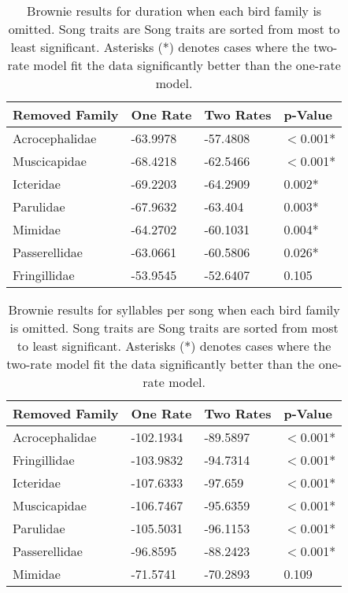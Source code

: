 \documentclass[a4paper,12pt]{article}
\begin{document}
\begin{table}[ht]
\caption{Brownie results for duration when each bird family is omitted. Song traits are Song traits are sorted from most to least significant. Asterisks (*) denotes cases where the two-rate model fit the data significantly better than the one-rate model.}
\centering
\begin{tabular}{llll}
  \hline
Removed Family & One Rate & Two Rates & p-Value \\ 
  \hline
Acrocephalidae & -63.9978 & -57.4808 & $<$0.001* \\ 
  Muscicapidae & -68.4218 & -62.5466 & $<$0.001* \\ 
  Icteridae & -69.2203 & -64.2909 & 0.002* \\ 
  Parulidae & -67.9632 & -63.404 & 0.003* \\ 
  Mimidae & -64.2702 & -60.1031 & 0.004* \\ 
  Passerellidae & -63.0661 & -60.5806 & 0.026* \\ 
  Fringillidae & -53.9545 & -52.6407 & 0.105 \\ 
   \hline
\end{tabular}
\end{table}
\begin{table}[ht]
\caption{Brownie results for syllables per song when each bird family is omitted. Song traits are Song traits are sorted from most to least significant. Asterisks (*) denotes cases where the two-rate model fit the data significantly better than the one-rate model.}
\centering
\begin{tabular}{llll}
  \hline
Removed Family & One Rate & Two Rates & p-Value \\ 
  \hline
Acrocephalidae & -102.1934 & -89.5897 & $<$0.001* \\ 
  Fringillidae & -103.9832 & -94.7314 & $<$0.001* \\ 
  Icteridae & -107.6333 & -97.659 & $<$0.001* \\ 
  Muscicapidae & -106.7467 & -95.6359 & $<$0.001* \\ 
  Parulidae & -105.5031 & -96.1153 & $<$0.001* \\ 
  Passerellidae & -96.8595 & -88.2423 & $<$0.001* \\ 
  Mimidae & -71.5741 & -70.2893 & 0.109 \\ 
   \hline
\end{tabular}
\end{table}
\end{document}
